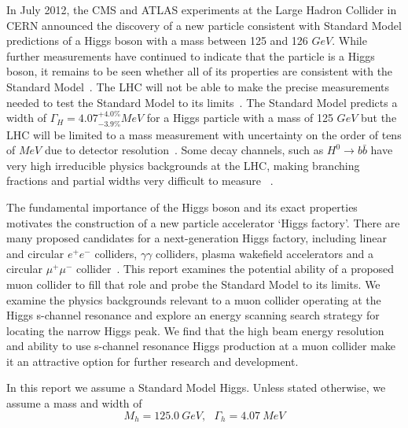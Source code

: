 \documentclass[a4paper]{article}
\begin{document}
In July 2012, the CMS and ATLAS experiments at the Large Hadron Collider in CERN announced the discovery of a new particle consistent with Standard Model predictions of a Higgs boson with a mass between 125 and 126 $GeV$. While further measurements have continued to indicate that the particle is a Higgs boson, it remains to be seen whether all of its properties are consistent with the Standard Model~\cite{cern-press}. The LHC will not be able to make the precise measurements needed to test the Standard Model to its limits~\cite{lhc-higgs-width}. The Standard Model predicts a width of $\Gamma_H = 4.07_{-3.9\%}^{+4.0\%} MeV$ for a Higgs particle with a mass of 125 $GeV$ but the LHC will be limited to a mass measurement with uncertainty on the order of tens of $MeV$ due to detector resolution~\cite{higgs-handbook,lhc-higgs-width}. Some decay channels, such as $H^0\rightarrow b\bar{b}$ have very high irreducible physics backgrounds at the LHC, making branching fractions and partial widths very difficult to measure~\cite{H-meas-muller,lhc-higgs-width} .
	
	The fundamental importance of the Higgs boson and its exact properties motivates the construction of a new particle accelerator `Higgs factory'. There are many proposed candidates for a next-generation Higgs factory, including linear and circular $e^+e^-$ colliders, $\gamma\gamma$ colliders, plasma wakefield accelerators and a circular $\mu^+\mu^-$ collider~\cite{HF-tech-opt-delahaye}. This report examines the potential ability of a proposed muon collider to fill that role and probe the Standard Model to its limits. We examine the physics backgrounds relevant to a muon collider operating at the Higgs s-channel resonance and explore an energy scanning search strategy for locating the narrow Higgs peak. We find that the high beam energy resolution and ability to use s-channel resonance Higgs production at a muon collider make it an attractive option for further research and development.

	In this report we assume a Standard Model Higgs. Unless stated otherwise, we assume a mass and width of 
\begin{equation}
	M_h = 125.0~GeV,\ \ \ \Gamma_h=4.07~MeV \label{eq:higgs-props}
\end{equation}
\end{document}
